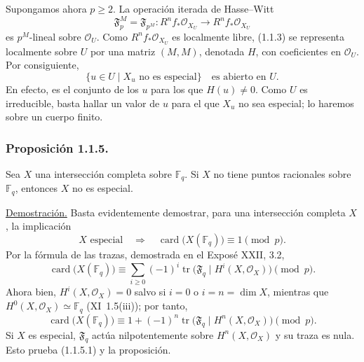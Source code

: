 Supongamos ahora $p\geq2$. La operación iterada de Hasse--Witt
\begin{equation}\tag{1.1.3}
\mathfrak F_p^M=\mathfrak F_{p^M}:
R^nf_*\mathcal O_{X_U}\longrightarrow R^nf_*\mathcal O_{X_U}
\end{equation}
es $p^M$-lineal sobre $\mathcal O_U$. Como
$R^nf_*\mathcal O_{X_U}$ es localmente libre, (1.1.3) se representa
localmente sobre $U$ por una matriz $(M,M)$, denotada $H$, con coeficientes
en $\mathcal O_U$. Por consiguiente,
\begin{equation}\tag{1.1.4}
\{u\in U\mid X_u\text{ no es especial}\}\quad\text{es abierto en }U.
\end{equation}
En efecto, es el conjunto de los $u$ para los que $H(u)\ne0$. Como $U$ es
irreducible, basta hallar un valor de $u$ para el que $X_u$ no sea
especial; lo haremos sobre un cuerpo finito.

\subsubsection*{Proposición 1.1.5.}
Sea $X$ una intersección completa sobre $\mathbb F_q$. Si $X$ no tiene
puntos racionales sobre $\mathbb F_q$, entonces $X$ no es especial.

\pageoriginale

\noindent\underline{Demostración.}
Basta evidentemente demostrar, para una intersección completa $X$, la
implicación
\begin{equation}\tag{1.1.5.1}
X\text{ especial}\quad\Longrightarrow\quad
\operatorname{card}\bigl(X(\mathbb F_q)\bigr)\equiv1\pmod p.
\end{equation}
Por la fórmula de las trazas, demostrada en el Exposé XXII, 3.2,
\begin{equation*}
\operatorname{card}\bigl(X(\mathbb F_q)\bigr)
\equiv\sum_{i\geq0}(-1)^i
\operatorname{tr}\bigl(\mathfrak F_q\mid H^i(X,\mathcal O_X)\bigr)
\pmod p.
\end{equation*}
Ahora bien, $H^i(X,\mathcal O_X)=0$ salvo si $i=0$ o
$i=n=\dim X$, mientras que
$H^0(X,\mathcal O_X)\simeq\mathbb F_q$ (XI~1.5(iii)); por tanto,
\begin{equation*}
\operatorname{card}\bigl(X(\mathbb F_q)\bigr)
\equiv1+(-1)^n
\operatorname{tr}\bigl(\mathfrak F_q\mid H^n(X,\mathcal O_X)\bigr)
\pmod p.
\end{equation*}
Si $X$ es especial, $\mathfrak F_q$ actúa nilpotentemente sobre
$H^n(X,\mathcal O_X)$ y su traza es nula. Esto prueba (1.1.5.1) y la
proposición.

